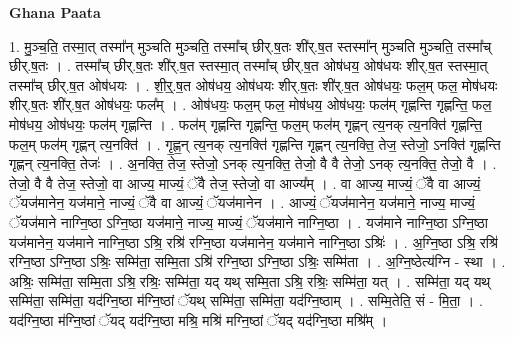 \documentclass[17pt]{extarticle}
\begin{document}
\textbf{Ghana Paata } \newline

1. मु॒ञ्च॒ति॒ तस्मा॒त् तस्मा᳚न् मुञ्चति मुञ्चति॒ तस्मा᳚च् छीर्.ष॒तः शी॑र्.ष॒त स्तस्मा᳚न् मुञ्चति मुञ्चति॒ तस्मा᳚च् छीर्.ष॒तः । . तस्मा᳚च् छीर्.ष॒तः शी॑र्.ष॒त स्तस्मा॒त् तस्मा᳚च् छीर्.ष॒त ओष॑धय॒ ओष॑धयः शीर्.ष॒त स्तस्मा॒त् तस्मा᳚च् छीर्.ष॒त ओष॑धयः । . शी॒र्॒.ष॒त ओष॑धय॒ ओष॑धयः शीर्.ष॒तः शी॑र्.ष॒त ओष॑धयः॒ फल॒म् फल॒ मोष॑धयः शीर्.ष॒तः शी॑र्.ष॒त ओष॑धयः॒ फल᳚म् । . ओष॑धयः॒ फल॒म् फल॒ मोष॑धय॒ ओष॑धयः॒ फल॑म् गृह्णन्ति गृह्णन्ति॒ फल॒ मोष॑धय॒ ओष॑धयः॒ फल॑म् गृह्णन्ति । . फल॑म् गृह्णन्ति गृह्णन्ति॒ फल॒म् फल॑म् गृह्णन् त्य॒नक् त्य॒नक्ति॑ गृह्णन्ति॒ फल॒म् फल॑म् गृह्णन् त्य॒नक्ति॑ । . गृ॒ह्ण॒न् त्य॒नक् त्य॒नक्ति॑ गृह्णन्ति गृह्णन् त्य॒नक्ति॒ तेज॒ स्तेजो॒ ऽनक्ति॑ गृह्णन्ति गृह्णन् त्य॒नक्ति॒ तेजः॑ । . अ॒नक्ति॒ तेज॒ स्तेजो॒ ऽनक् त्य॒नक्ति॒ तेजो॒ वै वै तेजो॒ ऽनक् त्य॒नक्ति॒ तेजो॒ वै । . तेजो॒ वै वै तेज॒ स्तेजो॒ वा आज्य॒ माज्यं॒ ॅवै तेज॒ स्तेजो॒ वा आज्य᳚म् । . वा आज्य॒ माज्यं॒ ॅवै वा आज्यं॒ ॅयज॑मानेन॒ यज॑माने॒ नाज्यं॒ ॅवै वा आज्यं॒ ॅयज॑मानेन । . आज्यं॒ ॅयज॑मानेन॒ यज॑माने॒ नाज्य॒ माज्यं॒ ॅयज॑माने नाग्नि॒ष्ठा ऽग्नि॒ष्ठा यज॑माने॒ नाज्य॒ माज्यं॒ ॅयज॑माने नाग्नि॒ष्ठा । . यज॑माने नाग्नि॒ष्ठा ऽग्नि॒ष्ठा यज॑मानेन॒ यज॑माने नाग्नि॒ष्ठा ऽश्रि॒ रश्रि॑ रग्नि॒ष्ठा यज॑मानेन॒ यज॑माने नाग्नि॒ष्ठा ऽश्रिः॑ । . अ॒ग्नि॒ष्ठा ऽश्रि॒ रश्रि॑ रग्नि॒ष्ठा ऽग्नि॒ष्ठा ऽश्रिः॒ सम्मि॑ता॒ सम्मि॒ता ऽश्रि॑ रग्नि॒ष्ठा ऽग्नि॒ष्ठा ऽश्रिः॒ सम्मि॑ता । . अ॒ग्नि॒ष्ठेत्य॑ग्नि - स्था । . अश्रिः॒ सम्मि॑ता॒ सम्मि॒ता ऽश्रि॒ रश्रिः॒ सम्मि॑ता॒ यद् यथ् सम्मि॒ता ऽश्रि॒ रश्रिः॒ सम्मि॑ता॒ यत् । . सम्मि॑ता॒ यद् यथ् सम्मि॑ता॒ सम्मि॑ता॒ यद॑ग्नि॒ष्ठा म॑ग्नि॒ष्ठां ॅयथ् सम्मि॑ता॒ सम्मि॑ता॒ यद॑ग्नि॒ष्ठाम् । . सम्मि॒तेति॒ सं - मि॒ता॒ । . यद॑ग्नि॒ष्ठा म॑ग्नि॒ष्ठां ॅयद् यद॑ग्नि॒ष्ठा मश्रि॒ मश्रि॑ मग्नि॒ष्ठां ॅयद् यद॑ग्नि॒ष्ठा मश्रि᳚म् । \newline
\end{document}
